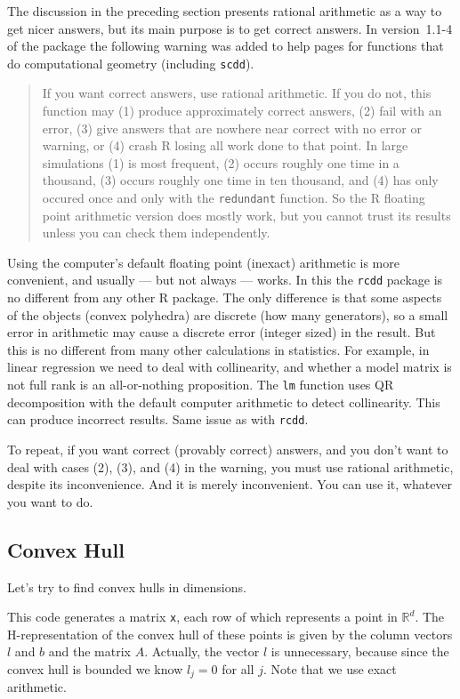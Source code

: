 \documentclass{article}
\newcommand{\real}{\mathbb{R}}
\begin{document}
The discussion in the preceding section presents rational arithmetic as
a way to get nicer answers, but its main purpose is to get correct answers.
In version~1.1-4 of the package the following warning was added to help
pages for functions that do computational geometry (including \texttt{scdd}).
\begin{quotation}
  If you want correct answers, use rational arithmetic.  If you do not,
  this function may (1) produce approximately correct answers, (2) fail with
  an error, (3) give answers that are nowhere near correct with no error or
  warning, or (4) crash R losing all work done to that point.  In large
  simulations (1) is most frequent, (2) occurs roughly one time in a thousand,
  (3) occurs roughly one time in ten thousand, and (4) has only occured once
  and only with the \texttt{redundant} function.  So the R floating point
  arithmetic version does mostly work, but you cannot trust its results unless
  you can check them independently.
\end{quotation}
Using the computer's default floating point (inexact) arithmetic is more
convenient, and usually --- but not always --- works.  In this
the \texttt{rcdd} package is no different from any other R package.
The only difference is that some aspects of the objects (convex polyhedra)
are discrete (how many generators), so a small error in arithmetic may cause
a discrete error (integer sized) in the result.  But this is no different
from many other calculations in statistics.  For example, in linear regression
we need to deal with collinearity, and whether a model matrix is not full rank
is an all-or-nothing proposition.  The \texttt{lm} function uses QR
decomposition with the default computer arithmetic to detect collinearity.
This can produce incorrect results.  Same issue as with \texttt{rcdd}.

To repeat, if you want correct (provably correct) answers, and you don't want
to deal with cases (2), (3), and (4) in the warning, you must use rational
arithmetic, despite its inconvenience.  And it is merely inconvenient.
You can use it, whatever you want to do.

\subsection{Convex Hull} \label{sec:conv1}

Let's try to find convex hulls in \verb@d@ dimensions.
\begin{Schunk}
\end{Schunk}
This code generates a matrix \texttt{x}, each row of which represents
a point in $\real^d$.  The H-representation of the convex hull of these
points is given by the column vectors $l$ and $b$ and the matrix $A$.
Actually, the vector $l$ is unnecessary, because since the convex hull
is bounded we know $l_j = 0$ for all $j$.  Note that we use
exact arithmetic.
\end{document}
